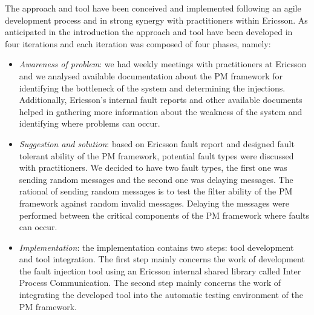The \approach{} approach and tool have been conceived and implemented following an agile development process %
and in strong synergy with practitioners within Ericsson. 
As anticipated in the introduction the approach and tool have been developed in four iterations and each iteration was composed of four phases, namely: 
\begin{itemize}
\item{\em Awareness of problem}: %
we had weekly 
meetings with practitioners %
at Ericsson and we analysed available documentation about the PM framework 
for identifying the bottleneck of the system and determining the injections. Additionally, Ericsson's internal fault reports and other available documents helped in gathering more information about the weakness of the system and identifying where problems can occur. 
\item 
{\em Suggestion and solution}: based on Ericsson fault report and designed fault tolerant ability of the PM framework, potential fault types were discussed with practitioners. We decided to have two fault types, the first one was sending random messages and the second one was delaying messages. The rational of sending random messages is to 
test the filter ability of the PM framework against random invalid messages. Delaying the messages were performed between the critical components of the PM framework where faults can occur.
\item 
{\em Implementation}: the implementation contains two steps: tool development and tool integration. The first step mainly concerns the work of development the fault injection tool using an Ericsson internal shared library called Inter Process Communication. The second step mainly concerns the work of integrating the developed tool into the automatic testing environment of the PM framework.

\end{itemize}
